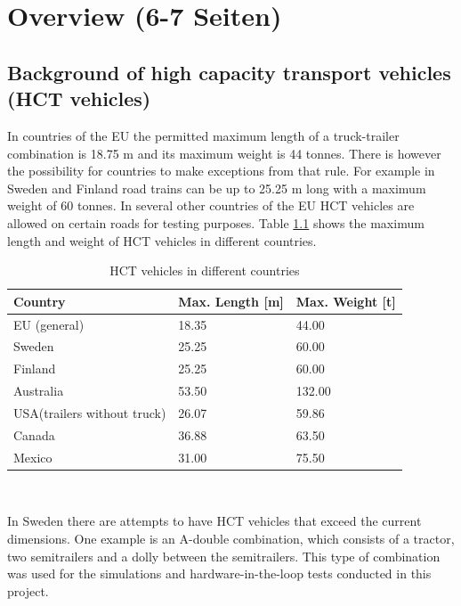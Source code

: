 \documentclass[ExampleMasters.tex]{subfiles}
\begin{document}
\clearpage
\chapter{Overview (6-7 Seiten)}
\label{chap:overview}


\section{Background of high capacity transport vehicles (HCT vehicles)}
\label{sec:legal_situation}

In countries of the EU the permitted maximum length of a truck-trailer combination is 18.75 m and its maximum weight is 44 tonnes. There is however the possibility for countries to make exceptions from that rule.\cite{96/53/EC}  For example in Sweden and Finland road trains can be up to 25.25 m long with a  maximum weight of 60 tonnes.\cite{Vaegverket}
In several other countries of the EU HCT vehicles are allowed on certain roads for testing purposes. 
Table \ref{tab:HCT_vehicles_in_different_countries} shows the maximum length and weight of HCT vehicles in different countries.

\begin{table}[h]
	\centering
	\caption{HCT vehicles in different countries\cite{Vaegverket}\cite{HCT_vehicles_Australia}\Cite{HCT_vehicles_USA}\cite{HCT_vehicles_Canada}\Cite{HCT_vehicles_Mexico}}
	\label{tab:HCT_vehicles_in_different_countries}
	\begin{tabular}{l|l|l|}
		Country   & Max. Length [m] & Max. Weight [t] \\ \hline
		EU (general) & 18.35 & 44.00\\
		Sweden    &       25.25      &       60.00      \\
		Finland   &            25.25 &         60.00    \\
		Australia &      53.50       &           132.00  \\
		USA(trailers without truck)&      26.07       &    59.86        \\
		Canada & 36.88 & 63.50 \\
		Mexico & 31.00 & 75.50 \\
	\end{tabular} \\
\end{table}
In Sweden there are attempts to have HCT vehicles that exceed the current dimensions. One example is an A-double combination, which consists of a tractor, two semitrailers and a dolly between the semitrailers. This type of combination was used for the simulations and hardware-in-the-loop tests conducted in this project.\\
\end{document}
